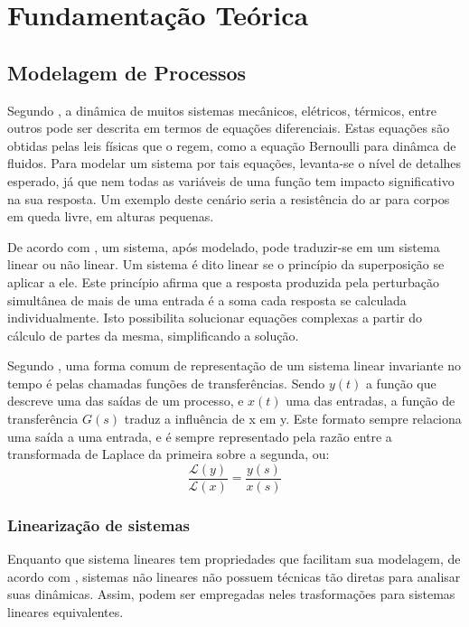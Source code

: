 \chapter{Fundamentação Teórica}

\section{Modelagem de Processos}

Segundo , a dinâmica de muitos sistemas mecânicos, elétricos, térmicos, entre outros pode ser descrita em termos de equações diferenciais. Estas equações são obtidas pelas leis físicas que o regem, como a equação Bernoulli para dinâmca de fluidos. Para modelar um sistema por tais equações, levanta-se o nível de detalhes esperado, já que nem todas as variáveis de uma função tem impacto significativo na sua resposta. Um exemplo deste cenário seria a resistência do ar para corpos em queda livre, em alturas pequenas.

De acordo com , um sistema, após modelado, pode traduzir-se em um sistema linear ou não linear. Um sistema é dito linear se o princípio da superposição se aplicar a ele. Este princípio afirma que a resposta produzida pela perturbação simultânea de mais de uma entrada é a soma cada resposta se calculada individualmente. Isto possibilita solucionar equações complexas a partir do cálculo de partes da mesma, simplificando a solução.

Segundo , uma forma comum de representação de um sistema linear invariante no tempo é pelas chamadas funções de transferências. Sendo $y(t)$ a função que descreve uma das saídas de um processo, e $x(t)$ uma das entradas, a função de transferência $G(s)$ traduz a influência de x em y. Este formato sempre relaciona uma saída a uma entrada, e é sempre representado pela razão entre a transformada de Laplace da primeira sobre a segunda, ou:
\begin{equation}
\frac{\mathcal{L}(y)}{\mathcal{L}(x)} = \frac{y{(s)}}{x(s)}
\end{equation}

\subsection{Linearização de sistemas}

Enquanto que sistema lineares tem propriedades que facilitam sua modelagem, de acordo com , sistemas não lineares não possuem técnicas tão diretas para analisar suas dinâmicas. Assim, podem ser empregadas neles trasformações para sistemas lineares equivalentes.

